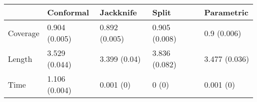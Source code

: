 \begin{tabular}{|l|l|l|l|l|}
\hline
& Conformal & Jackknife & Split & Parametric \\
\hline
Coverage & 0.904 (0.005) & 0.892 (0.005) & 0.905 (0.008) & 0.9 (0.006) \\
\hline
Length & 3.529 (0.044) & 3.399 (0.04) & 3.836 (0.082) & 3.477 (0.036) \\
\hline
Time & 1.106 (0.004) & 0.001 (0) & 0 (0) & 0.001 (0) \\
\hline
\end{tabular}
